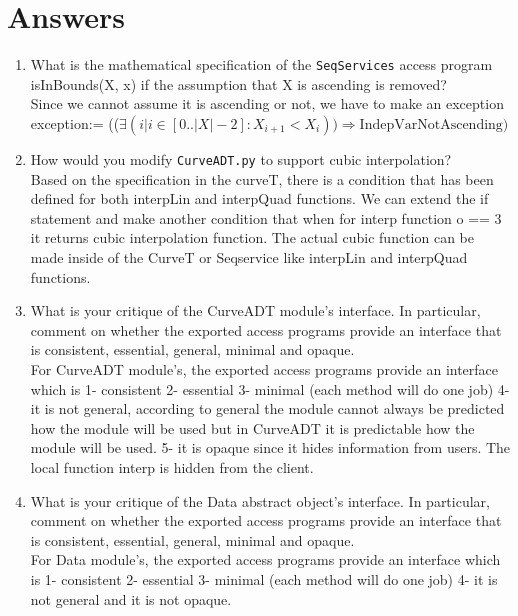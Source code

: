 \documentclass[12pt]{article}
\begin{document}
\section{Answers}

\begin{enumerate}

\item What is the mathematical specification of the \texttt{SeqServices} access
  program isInBounds(X, x) if the assumption that X is ascending is removed?\\
Since we cannot assume it is ascending or not, we have to make an exception\\
exception:= (($\exists(i | i \in [0..|X|-2] : X_{i+1} < X_i)) \Rightarrow \mbox{IndepVarNotAscending)}$

\item How would you modify \texttt{CurveADT.py} to support cubic interpolation? \\
Based on the specification in the curveT, there is a condition that has been defined for both interpLin and interpQuad functions. We can extend the if statement and
make another condition that when for interp function o == 3 it returns cubic interpolation function. The actual cubic function can be made inside of the CurveT or Seqservice
like interpLin and interpQuad functions. 

\item What is your critique of the CurveADT module's interface.  In particular,
  comment on whether the exported access programs provide an interface that is
  consistent, essential, general, minimal and opaque. \\
  For CurveADT module’s, the exported access programs provide an interface which is 
  1- consistent  2- essential  3- minimal (each method will do one job) 4- it is not general, according to general the module cannot always be predicted how the module will be used but in CurveADT it is predictable how the module will be used. 5- it is opaque since it hides information from users. The local function interp is hidden from the client. 
   
  

\item What is your critique of the Data abstract object's interface.  In
  particular, comment on whether the exported access programs provide an
  interface that is consistent, essential, general, minimal and opaque. \\
  For Data module’s, the exported access programs provide an interface which is
  1- consistent  2- essential  3- minimal (each method will do one job) 4- it is not general
  and it is not opaque.
  
  

\end{enumerate}
\end{document}
